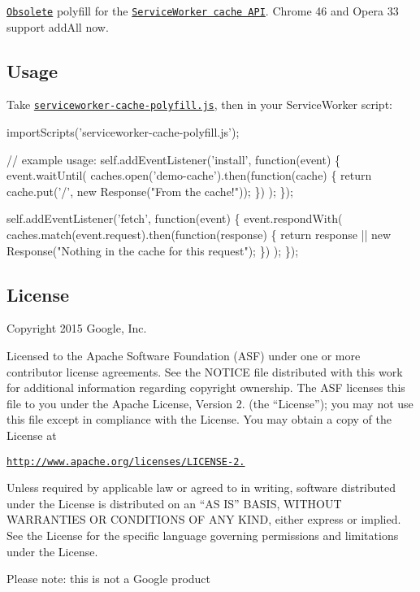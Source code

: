 \href{https://github.com/coonsta/cache-polyfill/issues/17#issuecomment-158628413}{\tt Obsolete} polyfill for the \href{http://slightlyoff.github.io/ServiceWorker/spec/service_worker/#cache-storage-interface}{\tt Service\+Worker cache A\+PI}. Chrome 46 and Opera 33 support {\ttfamily add\+All} now.

\subsection*{Usage}

Take \href{https://github.com/coonsta/cache-polyfill/blob/master/index.js}{\tt serviceworker-\/cache-\/polyfill.\+js}, then in your Service\+Worker script\+:


\begin{DoxyCode}
importScripts('serviceworker-cache-polyfill.js');

// example usage:
self.addEventListener('install', function(event) \{
  event.waitUntil(
    caches.open('demo-cache').then(function(cache) \{
      return cache.put('/', new Response("From the cache!"));
    \})
  );
\});

self.addEventListener('fetch', function(event) \{
  event.respondWith(
    caches.match(event.request).then(function(response) \{
      return response || new Response("Nothing in the cache for this request");
    \})
  );
\});
\end{DoxyCode}


\subsection*{License}

Copyright 2015 Google, Inc.

Licensed to the Apache Software Foundation (A\+SF) under one or more contributor license agreements. See the N\+O\+T\+I\+CE file distributed with this work for additional information regarding copyright ownership. The A\+SF licenses this file to you under the Apache License, Version 2. (the “\+License”); you may not use this file except in compliance with the License. You may obtain a copy of the License at

\href{http://www.apache.org/licenses/LICENSE-2.0}{\tt http\+://www.\+apache.\+org/licenses/\+L\+I\+C\+E\+N\+S\+E-\/2.}

Unless required by applicable law or agreed to in writing, software distributed under the License is distributed on an “\+AS I\+S” B\+A\+S\+IS, W\+I\+T\+H\+O\+UT W\+A\+R\+R\+A\+N\+T\+I\+ES OR C\+O\+N\+D\+I\+T\+I\+O\+NS OF A\+NY K\+I\+ND, either express or implied. See the License for the specific language governing permissions and limitations under the License.

Please note\+: this is not a Google product 